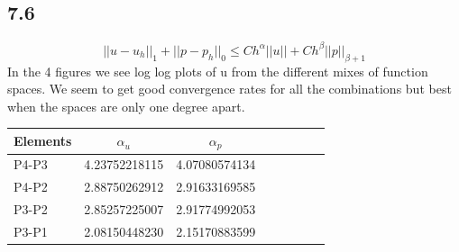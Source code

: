 \documentclass[a4paper,norsk]{article}
\begin{document}
\subsection*{7.6}
$$||u-u_h||_1 + ||p-p_h||_0 \leq C h^\alpha||u|| +  C h^\beta ||p||_{\beta+1}    $$
In the 4 figures we see log log plots of u from the different mixes of function spaces. We seem to get good convergence rates for all the combinations but best when the spaces are only one degree apart. \newline
\begin{tabular}{l*{6}{c}r}
Elements         & $\alpha_u$ & $\alpha_p$   \\
\hline
P4-P3           & 4.23752218115  & 4.07080574134\\
P4-P2           & 2.88750262912  & 2.91633169585 \\
P3-P2           & 2.85257225007  & 2.91774992053\\
P3-P1           & 2.08150448230   & 2.15170883599\\
\end{tabular}
\end{document}
